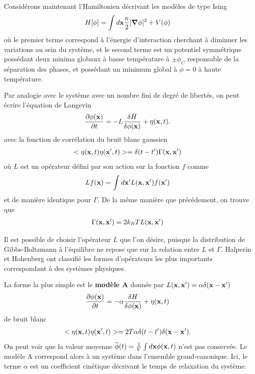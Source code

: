 Considérons maintenant l'Hamiltonien décrivant les modèles de type Ising
\begin{align}
    H[\phi] = \int d {\bf x}  \frac{\kappa}{2}[{\boldsymbol \nabla} \phi]^2 + V(\phi)
    \label{hamil-mean-field}
\end{align}
où le premier terme correspond à l'énergie d'interaction cherchant à diminuer les variations au sein du système, et le second terme est un potentiel symmétrique possédant deux minima globaux à basse température à $\pm \phi_C$ responsable de la séparation des phases, et possédant un minimum global à $\phi = 0$ à haute température. 

Par analogie avec le système avec un nombre fini de degré de libertés, on peut écrire l'équation de Langevin 
\begin{align}
    \frac{\partial \phi({\bf x})}{\partial t}= -L \frac{\delta H}{\delta \phi({\bf x})} + \eta({\bf x},t).
\end{align}
avec la fonction de corrélation du bruit blanc gaussien
\begin{align}
    < \eta({\bf x},t)\eta({\bf x}',t)> =\delta(t-t')\Gamma({\bf x},{\bf x}')
\end{align}
où  $L$ est un opérateur défini par son action sur la fonction $f$ comme
\begin{align}
    L f({\bf x}) = \int d{\bf x}' L({\bf x},{\bf x}')f({\bf x}')
\end{align}
et de manière identique pour $\Gamma$.
De la même manière que précédement, on trouve que 
\begin{align} 
    \Gamma({\bf x},{\bf x}') =2 k_B T L({\bf x},{\bf x}')
\end{align}

Il est possible de choisir l'opérateur $L$ que l'on désire, puisque la distribution de Gibbs-Boltzmann à l'équilibre ne repose que sur la relation entre $L$ et $\Gamma$. 
Halperin et Hohenberg \cite{hohenberg_theory_1977} ont classifié les formes d'opérateurs les plus importants correspondant à des systèmes physiques.

La forme la plus simple est le \textbf{modèle A} donnée par $L({\bf x},{\bf x}')=\alpha\delta({\bf x}-{\bf x}')$ 
\begin{align}
    \frac{\partial \phi({\bf x})}{\partial t}= -\alpha \frac{\delta H}{\delta \phi({\bf x})} + \eta({\bf x},t)
    \label{MA}
\end{align}
de bruit blanc
\begin{align}
    < \eta({\bf x},t)\eta({\bf x}',t)> =2T \alpha \delta(t-t')\delta({\bf x}-{\bf x}').
\end{align}
On peut voir que la valeur moyenne $\overline \phi(t) = \frac{1}{V}\int d{\bf x} \phi({\bf x},t)$ n'est pas conservée. Le modèle A correspond alors à un système dans l'ensemble grand-canonique. Ici, le terme $\alpha$ est un coefficient cinétique décrivant le temps de relaxation du système. 

